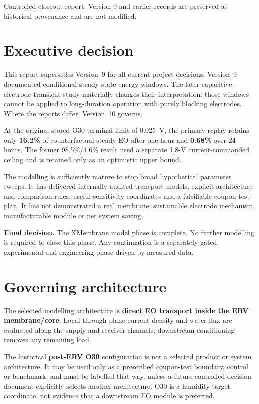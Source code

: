 \documentclass[10pt,a4paper]{article}
\newcommand{\sans}{\fontfamily{qhv}\selectfont}
\begin{document}
\vfill
{\sans\scriptsize\color{Slate}Controlled closeout report. Version 9 and
earlier records are preserved as historical provenance and are not modified.}

\clearpage
\section*{Executive decision}

This report supersedes Version~9 for all current project decisions. Version~9
documented conditional steady-state energy windows. The later
capacitive-electrode transient study materially changes their interpretation:
those windows cannot be applied to long-duration operation with purely
blocking electrodes. Where the reports differ, Version~10 governs.

At the original stored O30 terminal limit of 0.025~V, the primary replay
retains only \textbf{16.2\%} of counterfactual steady EO after one hour and
\textbf{0.68\%} over 24 hours. The former 98.5\%/4.6\% result used a separate
1.8-V current-commanded ceiling and is retained only as an optimistic upper
bound.

The modelling is sufficiently mature to stop broad hypothetical parameter
sweeps. It has delivered internally audited transport models, explicit
architecture and comparison rules, useful sensitivity coordinates and a
falsifiable coupon-test plan. It has not demonstrated a real membrane,
sustainable electrode mechanism, manufacturable module or net system saving.

\begin{mainbox}
\textbf{Final decision.} The XMembrane model phase is complete. No further
modelling is required to close this phase. Any continuation is a separately
gated experimental and engineering phase driven by measured data.
\end{mainbox}

\section*{Governing architecture}

The selected modelling architecture is \textbf{direct EO transport inside the
ERV membrane/core}. Local through-plane current density and water flux are
evaluated along the supply and receiver channels; downstream conditioning
removes any remaining load.

The historical \textbf{post-ERV O30} configuration is not a selected product
or system architecture. It may be used only as a prescribed coupon-test
boundary, control or benchmark, and must be labelled that way, unless a future
controlled decision document explicitly selects another architecture. O30 is
a humidity target coordinate, not evidence that a downstream EO module is
preferred.
\end{document}
